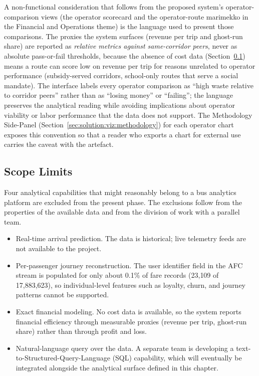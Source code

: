 A non-functional consideration that follows from the proposed system's
operator-comparison views (the operator scorecard and the operator-route
marimekko in the Financial and Operations theme) is the language used to
present those comparisons. The proxies the system surfaces (revenue per
trip and ghost-run share) are reported as \textit{relative metrics
against same-corridor peers}, never as absolute pass-or-fail thresholds,
because the absence of cost data (Section~\ref{sec:solution:problem:scope})
means a route can score low on revenue per trip for reasons unrelated to
operator performance (subsidy-served corridors, school-only routes that
serve a social mandate). The interface labels every operator comparison
as ``high waste relative to corridor peers'' rather than as ``losing
money'' or ``failing''; the language preserves the analytical reading
while avoiding implications about operator viability or labor
performance that the data does not support. The Methodology Side-Panel
(Section~\ref{sec:solution:viz:methodology}) for each operator chart
exposes this convention so that a reader who exports a chart for
external use carries the caveat with the artefact.

\subsection{Scope Limits}
\label{sec:solution:problem:scope}

Four analytical capabilities that might reasonably belong to a bus analytics
platform are excluded from the present phase. The exclusions follow from the
properties of the available data and from the division of work with a
parallel team.

\begin{itemize}
  \item Real-time arrival prediction. The data is historical; live telemetry feeds are not available to the project.
  \item Per-passenger journey reconstruction. The user identifier field in the AFC stream is populated for only about 0.1\% of fare records (23{,}109 of 17{,}883{,}623), so individual-level features such as loyalty, churn, and journey patterns cannot be supported.
  \item Exact financial modeling. No cost data is available, so the system reports financial efficiency through measurable proxies (revenue per trip, ghost-run share) rather than through profit and loss.
  \item Natural-language query over the data. A separate team is developing a text-to-Structured-Query-Language (SQL) capability, which will eventually be integrated alongside the analytical surface defined in this chapter.
\end{itemize}

